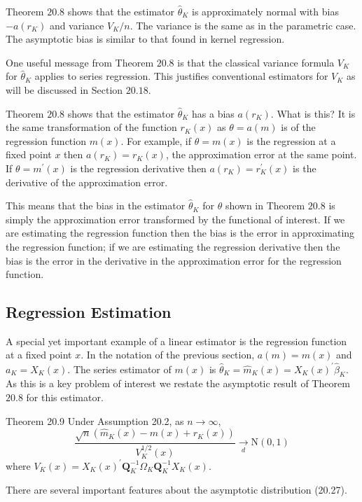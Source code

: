 \documentclass[10pt]{article}
\begin{document}
Theorem $20.8$ shows that the estimator $\widehat{\theta}_{K}$ is approximately normal with bias $-a\left(r_{K}\right)$ and variance $V_{K} / n$. The variance is the same as in the parametric case. The asymptotic bias is similar to that found in kernel regression.

One useful message from Theorem $20.8$ is that the classical variance formula $V_{K}$ for $\widehat{\theta}_{K}$ applies to series regression. This justifies conventional estimators for $V_{K}$ as will be discussed in Section $20.18$.

Theorem $20.8$ shows that the estimator $\widehat{\theta}_{K}$ has a bias $a\left(r_{K}\right)$. What is this? It is the same transformation of the function $r_{K}(x)$ as $\theta=a(m)$ is of the regression function $m(x)$. For example, if $\theta=m(x)$ is the regression at a fixed point $x$ then $a\left(r_{K}\right)=r_{K}(x)$, the approximation error at the same point. If $\theta=m^{\prime}(x)$ is the regression derivative then $a\left(r_{K}\right)=r_{K}^{\prime}(x)$ is the derivative of the approximation error.

This means that the bias in the estimator $\widehat{\theta}_{K}$ for $\theta$ shown in Theorem $20.8$ is simply the approximation error transformed by the functional of interest. If we are estimating the regression function then the bias is the error in approximating the regression function; if we are estimating the regression derivative then the bias is the error in the derivative in the approximation error for the regression function.

\subsection{Regression Estimation}
A special yet important example of a linear estimator is the regression function at a fixed point $x$. In the notation of the previous section, $a(m)=m(x)$ and $a_{K}=X_{K}(x)$. The series estimator of $m(x)$ is $\widehat{\theta}_{K}=\widehat{m}_{K}(x)=X_{K}(x)^{\prime} \widehat{\beta}_{K}$. As this is a key problem of interest we restate the asymptotic result of Theorem $20.8$ for this estimator.

Theorem 20.9 Under Assumption 20.2, as $n \rightarrow \infty$,
$$
\frac{\sqrt{n}\left(\hat{m}_{K}(x)-m(x)+r_{K}(x)\right)}{V_{K}^{1 / 2}(x)} \underset{d}{\longrightarrow} \mathrm{N}(0,1)
$$
where $V_{K}(x)=X_{K}(x)^{\prime} \boldsymbol{Q}_{K}^{-1} \Omega_{K} \boldsymbol{Q}_{K}^{-1} X_{K}(x)$.

There are several important features about the asymptotic distribution (20.27).
\end{document}
